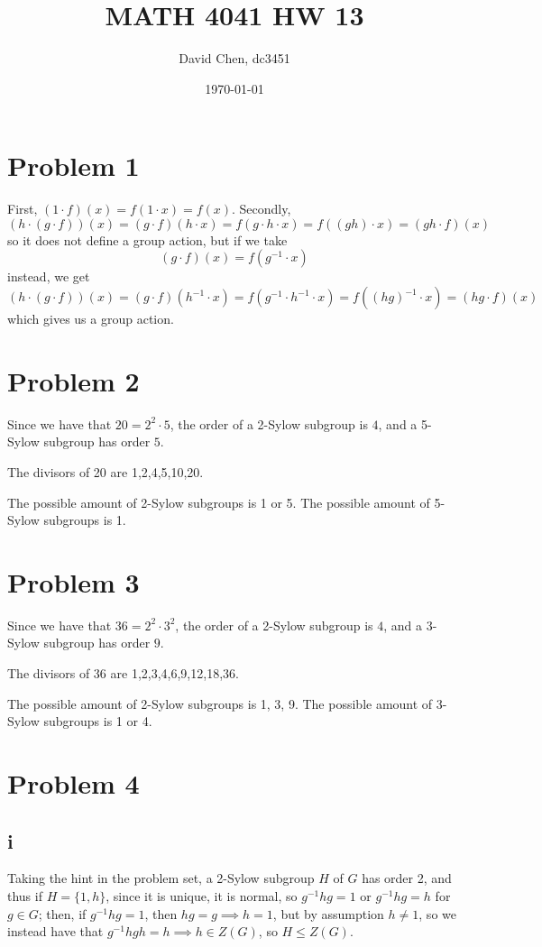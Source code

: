 \documentclass[12pt,letterpaper]{article}
\title{MATH 4041 HW 13}
\author{David Chen, dc3451}
\date{\today}
\theoremstyle{definition}
\begin{document}
\maketitle

\section*{Problem 1}

First, $(1 \cdot f)(x) = f(1 \cdot x) = f(x)$. Secondly,
\[
  (h \cdot (g \cdot f))(x) = (g \cdot f)(h\cdot x) = f(g \cdot h\cdot x) = f((gh) \cdot x) = (gh \cdot f)(x)
\]
so it does not define a group action, but if we take
\[
  (g \cdot f)(x) = f(g^{-1} \cdot x)
\]
instead, we get
\[
  (h \cdot (g \cdot f))(x) = (g \cdot f)(h^{-1} \cdot x) = f(g^{-1} \cdot h^{-1} \cdot x) = f((hg)^{-1} \cdot x) = (hg \cdot f)(x)
\]
which gives us a group action.

\section*{Problem 2}

Since we have that $20 = 2^{2} \cdot 5$, the order of a 2-Sylow subgroup is $4$, and a 5-Sylow subgroup has order $5$.

The divisors of 20 are 1,2,4,5,10,20.

The possible amount of 2-Sylow subgroups is 1 or 5. The possible amount of 5-Sylow subgroups is 1.

\section*{Problem 3}

Since we have that $36 = 2^{2} \cdot 3^{2}$, the order of a 2-Sylow subgroup is $4$, and a 3-Sylow subgroup has order $9$.

The divisors of 36 are 1,2,3,4,6,9,12,18,36.

The possible amount of 2-Sylow subgroups is 1, 3, 9. The possible amount of 3-Sylow subgroups is 1 or 4.

\section*{Problem 4}

\subsection*{i}

Taking the hint in the problem set, a 2-Sylow subgroup $H$ of $G$ has order 2, and thus if $H = \{1, h\}$, since it is unique, it is normal, so $g^{-1}hg = 1$ or $g^{-1}hg = h$ for $g \in G$; then, if $g^{-1}hg = 1$, then $hg = g \implies h = 1$, but by assumption $h \neq 1$, so we instead have that $g^{-1}hgh = h \implies h \in Z(G)$, so $H \leq Z(G)$.
\end{document}
